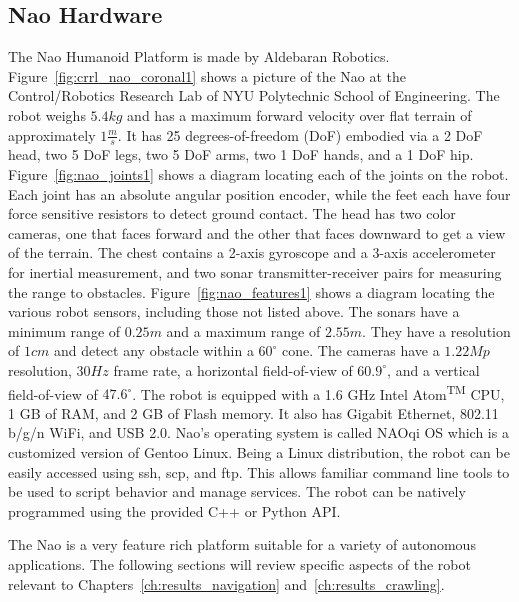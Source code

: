 \subsection{Nao Hardware}
The Nao Humanoid Platform is made by Aldebaran Robotics. 
Figure~\ref{fig:crrl_nao_coronal1} shows a picture of the Nao at the
Control/Robotics Research Lab of NYU Polytechnic School of Engineering.
The robot weighs $5.4 kg$ and has a maximum forward velocity over flat
terrain of approximately $1 \frac{m}{s}$.
It has 25 degrees-of-freedom (DoF) embodied via a 2 DoF head, two 5 DoF legs,
two 5 DoF arms, two 1 DoF hands, and a 1 DoF hip.
Figure~\ref{fig:nao_joints1} shows a diagram locating each of the joints on
the robot.
Each joint has an absolute angular position encoder, while the feet each have
four force sensitive resistors to detect ground contact.
The head has two color cameras, one that faces forward and the other that faces
downward to get a view of the terrain. The chest contains a 2-axis gyroscope and
a 3-axis accelerometer for inertial measurement, and two sonar transmitter-receiver
pairs for measuring the range to obstacles.
Figure~\ref{fig:nao_features1} shows a diagram locating the various robot sensors,
including those not listed above.
The sonars have a minimum range of $0.25 m$ and a maximum range of $2.55 m$.
They have a resolution of $1 cm$ and detect any obstacle within a $60^\circ$
cone. The cameras have a $1.22 Mp$ resolution, $30 Hz$ frame rate,
a horizontal field-of-view of $60.9^\circ$, and a vertical field-of-view of
$47.6^\circ$.
The robot is equipped with a 1.6 GHz Intel\textsuperscript{\textregistered}
Atom\textsuperscript{TM} CPU, 1 GB of RAM, and 2 GB of Flash memory.
It also has Gigabit Ethernet, 802.11 b/g/n WiFi, and USB 2.0. 
Nao's operating system is called NAOqi OS which is a customized version of
Gentoo Linux. Being a Linux distribution, the robot can be easily accessed
using ssh, scp, and ftp. This allows familiar command line tools to be used
to script behavior and manage services.
The robot can be natively programmed using the provided C++ or Python API.

The Nao is a very feature rich platform suitable for a variety of autonomous
applications. The following sections will review specific aspects of the robot
relevant to Chapters~\ref{ch:results_navigation} and~\ref{ch:results_crawling}.


